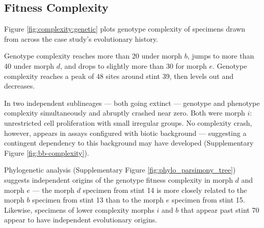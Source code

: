 


\subsection{Fitness Complexity}

Figure \ref{fig:complexity:genetic} plots genotype complexity of specimens drawn from across the case study's evolutionary history.

Genotype complexity reaches more than 20 under morph $b$, jumps to more than 40 under morph $d$, and drops to slightly more than 30 for morph $e$.
Genotype complexity reaches a peak of 48 sites around stint 39, then levels out and decreases.

In two independent sublineages --- both going extinct --- genotype and phenotype complexity simultaneously and abruptly crashed near zero.
Both were morph $i$: unrestricted cell proliferation with small irregular groups.
No complexity crash, however, appears in assays configured with biotic background --- suggesting a contingent dependency to this background may have developed (Supplementary Figure \ref{fig:bb-complexity}).

Phylogenetic analysis (Supplementary Figure \ref{fig:phylo_parsimony_tree}) suggests independent origins of the genotype fitness complexity in morph $d$ and morph $e$ --- the morph $d$ specimen from stint 14 is more closely related to the morph $b$ specimen from stint 13 than to the morph $e$ specimen from stint 15.
Likewise, specimens of lower complexity morphs $i$ and $b$ that appear past stint 70 appear to have independent evolutionary origins.

